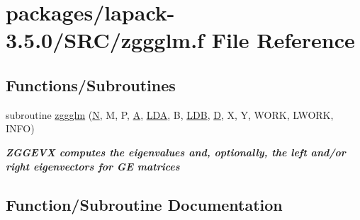 \hypertarget{zggglm_8f}{}\section{packages/lapack-\/3.5.0/\+S\+R\+C/zggglm.f File Reference}
\label{zggglm_8f}
\subsection*{Functions/\+Subroutines}
\begin{DoxyCompactItemize}
\item 
subroutine \hyperlink{zggglm_8f_a7e9ce5ea3c8adfc5d28e92904c34984f}{zggglm} (\hyperlink{polmisc_8c_a0240ac851181b84ac374872dc5434ee4}{N}, M, P, \hyperlink{classA}{A}, \hyperlink{example__user_8c_ae946da542ce0db94dced19b2ecefd1aa}{L\+D\+A}, B, \hyperlink{example__user_8c_a50e90a7104df172b5a89a06c47fcca04}{L\+D\+B}, \hyperlink{odrpack_8h_a7dae6ea403d00f3687f24a874e67d139}{D}, X, Y, W\+O\+R\+K, L\+W\+O\+R\+K, I\+N\+F\+O)
\begin{DoxyCompactList}\small\item\em {\bfseries  Z\+G\+G\+E\+V\+X computes the eigenvalues and, optionally, the left and/or right eigenvectors for G\+E matrices} \end{DoxyCompactList}\end{DoxyCompactItemize}


\subsection{Function/\+Subroutine Documentation}
\hypertarget{zggglm_8f_a7e9ce5ea3c8adfc5d28e92904c34984f}{}
